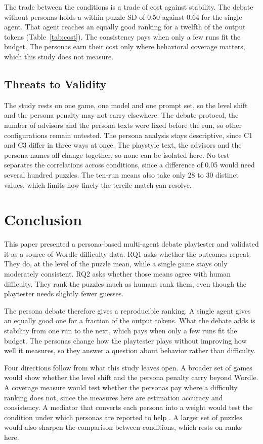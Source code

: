 \documentclass[conference]{IEEEtran}
\begin{document}
The trade between the conditions is a trade of cost against stability. The debate without personas holds a within-puzzle SD of 0.50 against 0.64 for the single agent. That agent reaches an equally good ranking for a twelfth of the output tokens (Table~\ref{tab:cost}). The consistency pays when only a few runs fit the budget. The personas earn their cost only where behavioral coverage matters, which this study does not measure.

\subsection{Threats to Validity}

The study rests on one game, one model and one prompt set, so the level shift and the persona penalty may not carry elsewhere. The debate protocol, the number of advisors and the persona texts were fixed before the run, so other configurations remain untested. The persona analysis stays descriptive, since C1 and C3 differ in three ways at once. The playstyle text, the advisors and the persona names all change together, so none can be isolated here. No test separates the correlations across conditions, since a difference of 0.05 would need several hundred puzzles. The ten-run means also take only 28 to 30 distinct values, which limits how finely the tercile match can resolve.

\section{Conclusion}
\label{sec:conclusion}

This paper presented a persona-based multi-agent debate playtester and validated it as a source of Wordle difficulty data. RQ1 asks whether the outcomes repeat. They do, at the level of the puzzle mean, while a single game stays only moderately consistent. RQ2 asks whether those means agree with human difficulty. They rank the puzzles much as humans rank them, even though the playtester needs slightly fewer guesses.

The persona debate therefore gives a reproducible ranking. A single agent gives an equally good one for a fraction of the output tokens. What the debate adds is stability from one run to the next, which pays when only a few runs fit the budget. The personas change how the playtester plays without improving how well it measures, so they answer a question about behavior rather than difficulty.

Four directions follow from what this study leaves open. A broader set of games would show whether the level shift and the persona penalty carry beyond Wordle. A coverage measure would test whether the personas pay where a difficulty ranking does not, since the measures here are estimation accuracy and consistency. A mediator that converts each persona into a weight would test the condition under which personas are reported to help \cite{licato2025}. A larger set of puzzles would also sharpen the comparison between conditions, which rests on ranks here.



\end{document}
